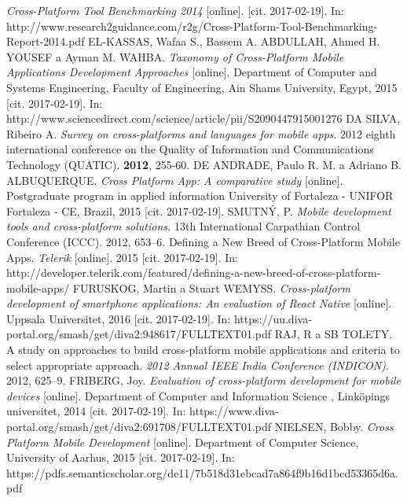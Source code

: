 \documentclass[english,master,public,dept460,male,cpdeclaration,oneside]{diploma}
\begin{document}
\begin{thebibliography}{99}
	 \textit{Cross-Platform Tool Benchmarking 2014} [online]. [cit. 2017-02-19]. In: http://www.research2guidance.com/r2g/Cross-Platform-Tool-Benchmarking-Report-2014.pdf
	EL-KASSAS, Wafaa S., Bassem A. ABDULLAH, Ahmed H. YOUSEF a Ayman M. WAHBA. \textit{Taxonomy of Cross-Platform Mobile Applications Development Approaches} [online]. Department of Computer and Systems Engineering, Faculty of Engineering, Ain Shams University, Egypt, 2015 [cit. 2017-02-19]. In: http://www.sciencedirect.com/science/article/pii/S2090447915001276
	 DA SILVA, Ribeiro A. \textit{Survey on cross-platforms and languages for mobile apps}. 2012 eighth international conference on the Quality of Information and Communications Technology (QUATIC). \textbf{2012}, 255-60.
	DE ANDRADE, Paulo R. M. a Adriano B. ALBUQUERQUE. \textit{Cross Platform App: A comparative study} [online]. Postgraduate program in applied information University of Fortaleza - UNIFOR Fortaleza - CE, Brazil, 2015 [cit. 2017-02-19].
	SMUTNÝ, P. \textit{Mobile development tools and cross-platform solutions.} 13th International Carpathian Control Conference (ICCC). 2012, 653–6.
	 Defining a New Breed of Cross-Platform Mobile Apps. \textit{Telerik} [online]. 2015 [cit. 2017-02-19]. In: http://developer.telerik.com/featured/defining-a-new-breed-of-cross-platform-mobile-apps/
	 FURUSKOG, Martin a Stuart WEMYSS. \textit{Cross-platform development of smartphone applications: An evaluation of React Native} [online]. Uppsala Universitet, 2016 [cit. 2017-02-19]. In: https://uu.diva-portal.org/smash/get/diva2:948617/FULLTEXT01.pdf
	 RAJ, R a SB TOLETY. A study on approaches to build cross-platform mobile applications and criteria to select appropriate approach. \textit{2012 Annual IEEE India Conference (INDICON)}. 2012, 625–9.
	 FRIBERG, Joy. \textit{Evaluation of cross-platform development for mobile devices} [online]. Department of Computer and Information Science , Linköpings universitet, 2014 [cit. 2017-02-19]. In: https://www.diva-portal.org/smash/get/diva2:691708/FULLTEXT01.pdf
	NIELSEN, Bobby. \textit{Cross Platform Mobile Development} [online]. Department of Computer Science, University of Aarhus, 2015 [cit. 2017-02-19]. In: https://pdfs.semanticscholar.org/de11/7b518d31ebcad7a864f9b16d1bcd53365d6a.pdf
	
\end{thebibliography}
\end{document}
